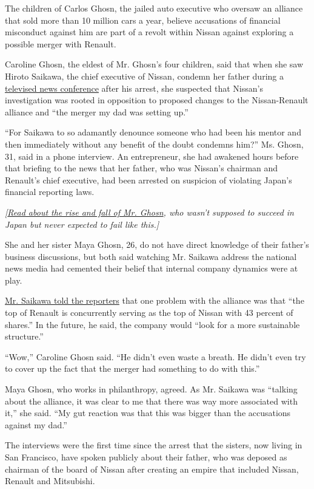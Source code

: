The children of Carlos Ghosn, the jailed auto executive who oversaw an
alliance that sold more than 10 million cars a year, believe accusations
of financial misconduct against him are part of a revolt within Nissan
against exploring a possible merger with Renault.

Caroline Ghosn, the eldest of Mr. Ghosn's four children, said that when
she saw Hiroto Saikawa, the chief executive of Nissan, condemn her
father during a
\href{https://www.youtube.com/watch?v=QNjO4vyjU0w}{televised news
conference} after his arrest, she suspected that Nissan's investigation
was rooted in opposition to proposed changes to the Nissan-Renault
alliance and ``the merger my dad was setting up.''

``For Saikawa to so adamantly denounce someone who had been his mentor
and then immediately without any benefit of the doubt condemns him?''
Ms. Ghosn, 31, said in a phone interview. An entrepreneur, she had
awakened hours before that briefing to the news that her father, who was
Nissan's chairman and Renault's chief executive, had been arrested on
suspicion of violating Japan's financial reporting laws.

\emph{{[}}\href{https://www.nytimes.com/2018/12/30/business/carlos-ghosn-nissan.html}{\emph{Read
about the rise and fall of Mr. Ghosn}}\emph{, who wasn't supposed to
succeed in Japan but never expected to fail like this.{]}}

She and her sister Maya Ghosn, 26, do not have direct knowledge of their
father's business discussions, but both said watching Mr. Saikawa
address the national news media had cemented their belief that internal
company dynamics were at play.

\href{https://www.youtube.com/watch?v=vRkJtTrhQBk}{Mr. Saikawa told the
reporters} that one problem with the alliance was that ``the top of
Renault is concurrently serving as the top of Nissan with 43 percent of
shares.'' In the future, he said, the company would ``look for a more
sustainable structure.''

``Wow,'' Caroline Ghosn said. ``He didn't even waste a breath. He didn't
even try to cover up the fact that the merger had something to do with
this.''

Maya Ghosn, who works in philanthropy, agreed. As Mr. Saikawa was
``talking about the alliance, it was clear to me that there was way more
associated with it,'' she said. ``My gut reaction was that this was
bigger than the accusations against my dad.''

The interviews were the first time since the arrest that the sisters,
now living in San Francisco, have spoken publicly about their father,
who was deposed as chairman of the board of Nissan after creating an
empire that included Nissan, Renault and Mitsubishi.

